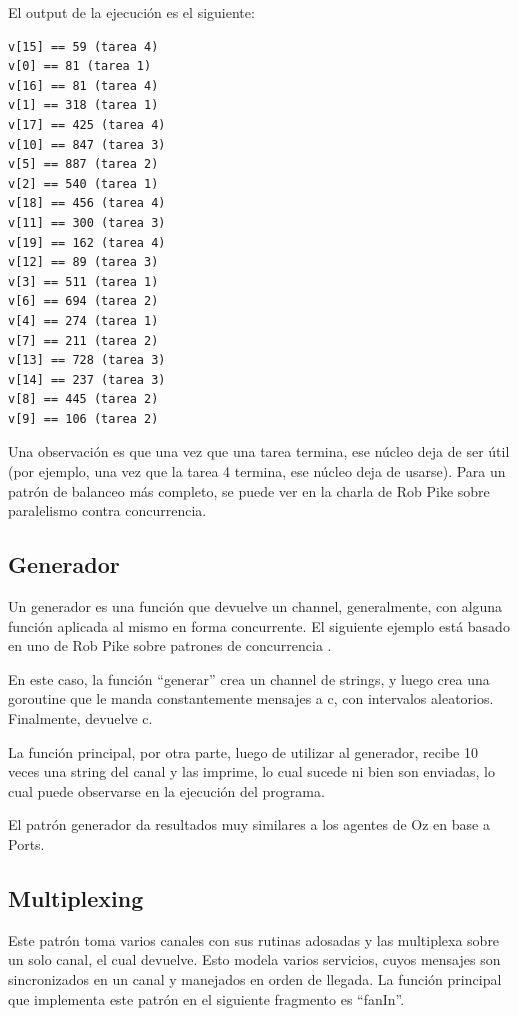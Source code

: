\documentclass{article}
\begin{document}
El output de la ejecución es el siguiente: 
\begin{verbatim}
v[15] == 59 (tarea 4) 
v[0] == 81 (tarea 1) 
v[16] == 81 (tarea 4) 
v[1] == 318 (tarea 1) 
v[17] == 425 (tarea 4) 
v[10] == 847 (tarea 3) 
v[5] == 887 (tarea 2) 
v[2] == 540 (tarea 1) 
v[18] == 456 (tarea 4) 
v[11] == 300 (tarea 3) 
v[19] == 162 (tarea 4) 
v[12] == 89 (tarea 3) 
v[3] == 511 (tarea 1) 
v[6] == 694 (tarea 2) 
v[4] == 274 (tarea 1) 
v[7] == 211 (tarea 2) 
v[13] == 728 (tarea 3) 
v[14] == 237 (tarea 3) 
v[8] == 445 (tarea 2) 
v[9] == 106 (tarea 2) 
\end{verbatim}

Una observación es que una vez que una tarea termina, ese núcleo deja de ser útil (por ejemplo, una vez que la tarea 4 termina, ese núcleo deja de usarse). Para un patrón de balanceo más completo, se puede ver en la charla de Rob Pike sobre paralelismo contra concurrencia\cite{parvscon}.
\subsection{Generador}
Un generador es una función que devuelve un channel, generalmente, con alguna función aplicada al mismo en forma concurrente. El siguiente ejemplo está basado en uno de Rob Pike sobre patrones de concurrencia \cite{video}.



En este caso, la función ``generar'' crea un channel de strings, y luego crea una goroutine que le manda constantemente mensajes a c, con intervalos aleatorios. Finalmente, devuelve c.

La función principal, por otra parte, luego de utilizar al generador, recibe 10 veces una string del canal y las imprime, lo cual sucede ni bien son enviadas, lo cual puede observarse en la ejecución del programa.

El patrón generador da resultados muy similares a los agentes de Oz en base a Ports.

\subsection{Multiplexing}
Este patrón toma varios canales con sus rutinas adosadas y las multiplexa sobre un solo canal, el cual devuelve. Esto modela varios servicios, cuyos mensajes son sincronizados en un canal y manejados en orden de llegada. La función principal que implementa este patrón en el siguiente fragmento es ``fanIn''.

\end{document}
